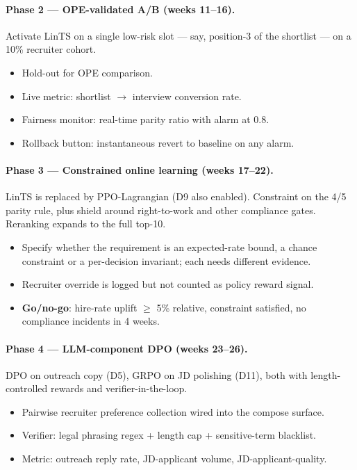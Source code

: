 \documentclass[11pt,oneside]{scrbook}
\begin{document}
\paragraph{Phase 2 --- OPE-validated A/B (weeks 11--16).}
Activate LinTS on a single low-risk slot --- say, position-3 of the
shortlist --- on a 10\% recruiter cohort.

\begin{itemize}
  \item Hold-out for OPE comparison.
  \item Live metric: shortlist $\to$ interview conversion rate.
  \item Fairness monitor: real-time parity ratio with alarm at 0.8.
  \item Rollback button: instantaneous revert to baseline on any alarm.
\end{itemize}

\paragraph{Phase 3 --- Constrained online learning (weeks 17--22).}
LinTS is replaced by PPO-Lagrangian (D9 also enabled). Constraint on the
4/5 parity rule, plus shield around right-to-work and other compliance
gates. Reranking expands to the full top-10.

\begin{itemize}
  \item Specify whether the requirement is an expected-rate bound, a chance constraint or a per-decision invariant; each needs different evidence.
  \item Recruiter override is logged but not counted as policy reward
        signal.
  \item \textbf{Go/no-go}: hire-rate uplift $\ge$ 5\% relative,
        constraint satisfied, no compliance incidents in 4 weeks.
\end{itemize}

\paragraph{Phase 4 --- LLM-component DPO (weeks 23--26).}
DPO on outreach copy (D5), GRPO on JD polishing (D11), both with
length-controlled rewards and verifier-in-the-loop.

\begin{itemize}
  \item Pairwise recruiter preference collection wired into the
        compose surface.
  \item Verifier: legal phrasing regex + length cap + sensitive-term
        blacklist.
  \item Metric: outreach reply rate, JD-applicant volume,
        JD-applicant-quality.
\end{itemize}
\end{document}
